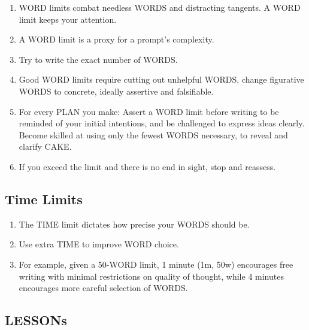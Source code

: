 \documentclass[
]{book}
\providecommand{\tightlist}{%
  \setlength{\itemsep}{0pt}\setlength{\parskip}{0pt}}
\begin{document}
\begin{enumerate}
\def\labelenumi{\arabic{enumi}.}
\setcounter{enumi}{9}
\tightlist
\item
  WORD limits combat needless WORDS and distracting tangents. A
  WORD limit keeps your attention.
\item
  A WORD limit is a proxy for a prompt's complexity.
\item
  Try to write the exact number of WORDS.
\item
  Good WORD limits require cutting out unhelpful WORDS, change
  figurative WORDS to concrete, ideally assertive and falsifiable.
\item
  For every PLAN you make: Assert a WORD limit before writing
  to be reminded of your initial intentions, and
  be challenged to express ideas clearly.
  Become skilled at using only the fewest WORDS necessary, to
  reveal and clarify CAKE.
\item
  If you exceed the limit and there is no end in sight, stop and reassess.
\end{enumerate}

\hypertarget{time-limits}{%
\subsection{Time Limits}\label{time-limits}}

\begin{enumerate}
\def\labelenumi{\arabic{enumi}.}
\setcounter{enumi}{15}
\tightlist
\item
  The TIME limit dictates how precise your WORDS should be.
\item
  Use extra TIME to improve WORD choice.
\item
  For example, given a 50-WORD limit, 1 minute (1m, 50w) encourages
  free writing with minimal restrictions on quality of thought, while 4 minutes encourages more careful selection of WORDS.
\end{enumerate}

\hypertarget{lessons}{%
\subsection{LESSONs}\label{lessons}}
\end{document}
